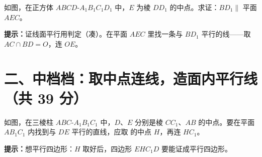 \documentclass{exam-zh}
\begin{document}

\begin{problem}[points=10]
  \noindent
  \begin{minipage}[t]{\dimexpr\linewidth-60mm-6mm\relax}
    \vspace{0pt}
    如图，在正方体 $ABCD$-$A_{1}B_{1}C_{1}D_{1}$ 中，$E$ 为棱 $DD_{1}$ 的中点。求证：$BD_{1}\parallel$ 平面 $AEC$。

    \begin{hintbox}
\textbf{提示：}证线面平行用判定（凑）。在平面 $AEC$ 里找一条与 $BD_{1}$ 平行的线——取 $AC\cap BD=O$，连 $OE$。\end{hintbox}

  \end{minipage}\hfill
  \begin{diagramcoltikz}{60mm}{$O$ 是 $AC$ 与 $BD$ 的交点，连 $OE$ 看中位线。}
  }
  \end{diagramcoltikz}
  \par\medskip
  \answerarea[55mm]
\end{problem}


\clearpage
\section*{二、中档档：取中点连线，造面内平行线（共 39 分）}


\begin{question}[points=7]
  \noindent
  \begin{minipage}[t]{\dimexpr\linewidth-60mm-6mm\relax}
    \vspace{0pt}
    如图，在三棱柱 $ABC$-$A_{1}B_{1}C_{1}$ 中，$D$、$E$ 分别是棱 $CC_{1}$、$AB$ 的中点。要在平面 $AB_{1}C_{1}$ 内找到与 $DE$ 平行的直线，应取 \underline{\hspace{3em}} 的中点 $H$，再连 $HC_{1}$。
    \begin{hintbox}
\textbf{提示：}想平行四边形：$H$ 取好后，四边形 $EHC_{1}D$ 要能证成平行四边形。\end{hintbox}

  \end{minipage}\hfill
  \begin{diagramcoltikz}{60mm}{三棱柱中 $D$、$E$ 为中点，构造平行四边形 $EHC_{1}D$。}
  }
  \end{diagramcoltikz}
\end{question}
\end{document}
